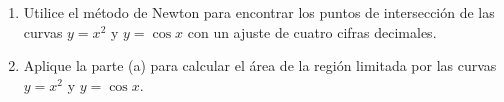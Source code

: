 \item 
\begin{enumerate}
    \item[(a)] Utilice el método de Newton para encontrar los puntos de intersección de las curvas $y = x^2$ y $y = \cos x$ con un ajuste de cuatro cifras decimales.
    \item[(b)] Aplique la parte (a) para calcular el área de la región limitada por las curvas $y = x^2$ y $y = \cos x$.
\end{enumerate}
